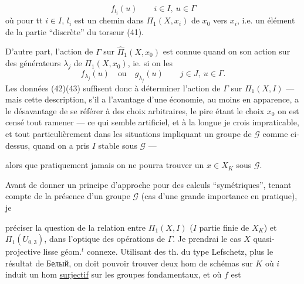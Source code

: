 \[
\tag{41}f_{l_i}(u)\qquad i\in I,\ u\in\Gamma
\]
où pour tt $i\in I$, $l_i$ est un chemin dans $\Pi_1(X,x_i)$ de $x_0$ vers $x_i$, i.e. un élément de la partie ``discrète'' du torseur (41).

D'autre part, l'action de $\Gamma$ sur $\widehat\Pi_1(X,x_0)$ est connue quand on  son action sur des générateurs $\lambda_j$  de $\Pi_1(X,x_0)$, ie. si on  les
\[
\tag{43}f_{\lambda_j}(u)\quad\text{ou}\quad g_{\lambda_j}(u)\qquad j\in J,\ u\in\Gamma.
\]
 Les données (42)(43) suffisent donc à déterminer l'action de $\Gamma$ sur $\Pi_1(X,I)$ --- mais cette description,   s'il a l'avantage d'une économie, au moins en apparence, a le désavantage de se référer à des choix arbitraires, le pire étant le choix    $x_0$   on est censé tout ramener --- ce qui semble artificiel, et à la longue je crois impraticable,  et tout particulièrement dans les situations impliquant un groupe de  $\mathcal G$ comme ci-dessus, quand on a pris $I$ stable sous $\mathcal G$ ---

alors que pratiquement jamais on ne pourra trouver un $x\in X_K$   sous $\mathcal G$.

Avant de donner un principe d'approche pour des calculs ``symétriques'', tenant compte de la présence d'un groupe $\mathcal G$ (cas d'une grande importance en pratique), je  préciser la question de la relation entre $\Pi_1(X,I)$ ($I$ partie finie de $X_K$) et $\Pi_1(U_{0,3})$,  dans l'optique des opérations de $\Gamma$.
  Je prendrai le cas $X$ quasi-projective lisse géom.$^t$ connexe. Utilisant des th. du type Lefschetz, plus le résultat de  Белый, on  doit pouvoir trouver deux hom de schémas sur $K$
où $i$ induit un hom \uline{surjectif} sur les groupes fondamentaux, et où $f$ est

